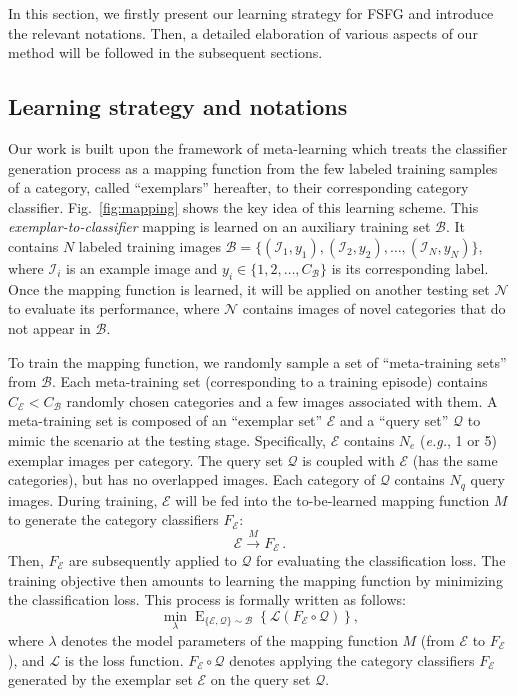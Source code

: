 \documentclass[10pt,twocolumn,letterpaper]{article}
\begin{document}
In this section, we firstly present our learning strategy for FSFG and introduce the relevant notations. Then, a detailed elaboration of various aspects of our method will be followed in the subsequent sections. 

\subsection{Learning strategy and notations}

Our work is built upon the framework of meta-learning which treats the classifier generation process as a mapping function from the few labeled training samples of a category, called ``exemplars'' hereafter, to their corresponding category classifier. Fig.~\ref{fig:mapping} shows the key idea of this learning scheme. This \emph{exemplar-to-classifier} mapping is learned on an auxiliary training set $\mathcal{B}$. It contains $N$ labeled training images $\mathcal{B}=\{(\mathcal{I}_1,y_1),(\mathcal{I}_2,y_2),\ldots,(\mathcal{I}_N,y_N)\}$, where $\mathcal{I}_i$ is an example image and $y_i\in\{1,2,\ldots,C_{\mathcal{B}}\}$ is its corresponding label. Once the mapping function is learned, it will be applied on another testing set $\mathcal{N}$ to evaluate its performance, where $\mathcal{N}$ contains images of novel categories that do not appear in $\mathcal{B}$. 

To train the mapping function, we randomly sample a set of ``meta-training sets'' from $\mathcal{B}$. Each meta-training set (corresponding to a training episode) contains $C_{\mathcal{E}}<C_{\mathcal{B}}$ randomly chosen categories and a few images associated with them. A meta-training set is composed of an ``{exemplar set}'' $\mathcal{E}$ and a ``{query set}'' $\mathcal{Q}$ to mimic the scenario at the testing stage. Specifically, $\mathcal{E}$ contains $N_e$ (\emph{e.g.}, 1 or 5) exemplar images per category. The query set $\mathcal{Q}$ is coupled with $\mathcal{E}$ (has the same categories), but has no overlapped images. Each category of $\mathcal{Q}$ contains $N_q$ query images. During training, $\mathcal{E}$ will be fed into the to-be-learned mapping function $M$ to generate the category classifiers $F_{\mathcal{E}}$:
\begin{equation}\label{eq:mapping}
 \mathcal{E} \xrightarrow{M} F_{\mathcal{E}} \,.
\end{equation}
Then, $F_{\mathcal{E}}$ are subsequently applied to $\mathcal{Q}$ for evaluating the classification loss. The training objective then amounts to learning the mapping function by minimizing the classification loss. This process is formally written as follows:
\begin{equation}\label{eq:mapping}
 \min_{\lambda} \mathop{E}_{\{\mathcal{E},\mathcal{Q}\} \sim \mathcal{B}} \left\{ \mathcal{L}\left( F_{\mathcal{E}}\circ \mathcal{Q}\right) \right\},
\end{equation}where $\lambda$ denotes the model parameters of the mapping function $M$ (from $\mathcal{E}$ to $F_{\mathcal{E}}$), and $\mathcal{L}$ is the loss function.  $F_{\mathcal{E}}\circ \mathcal{Q}$ denotes applying the category classifiers $F_{\mathcal{E}}$ generated by the exemplar set $\mathcal{E}$ on the query set $\mathcal{Q}$.
 
\end{document}
